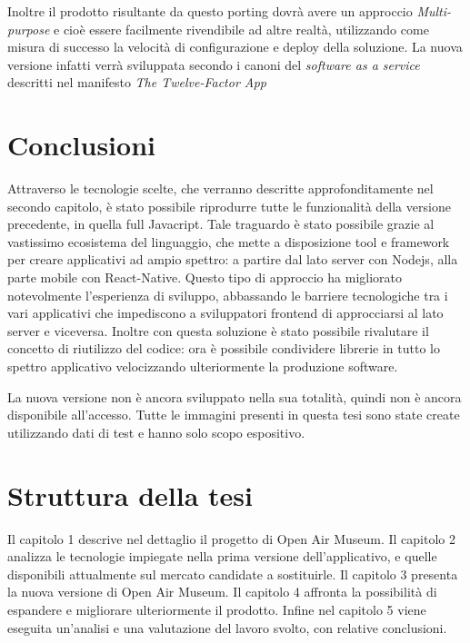 	Inoltre il prodotto risultante da questo porting dovrà avere un approccio \emph{Multi-purpose} e cioè essere facilmente rivendibile ad altre realtà, utilizzando come misura di successo la velocità di configurazione e deploy della soluzione. La nuova versione infatti verrà sviluppata secondo i canoni del \emph{software as a service} descritti nel manifesto \emph{The Twelve-Factor App}\cite{twfapp}

\section*{Conclusioni}\vspace{5mm}

Attraverso le tecnologie scelte, che verranno descritte approfonditamente nel secondo capitolo, è stato possibile riprodurre tutte le funzionalità della versione precedente, in quella full Javacript. Tale traguardo è stato possibile grazie al vastissimo ecosistema del linguaggio, che mette a disposizione tool e framework per creare applicativi ad ampio spettro: a partire dal lato server con Nodejs, alla parte mobile con React-Native. Questo tipo di approccio ha migliorato notevolmente l'esperienza di sviluppo, abbassando le barriere tecnologiche tra i vari applicativi che impediscono a sviluppatori frontend di approcciarsi al lato server e viceversa. Inoltre con questa soluzione è stato possibile rivalutare il concetto di riutilizzo del codice: ora è possibile condividere librerie in tutto lo spettro applicativo velocizzando ulteriormente la produzione software.\vspace{5mm}

La nuova versione non è ancora sviluppato nella sua totalità, quindi non è ancora disponibile all'accesso. Tutte le immagini presenti in questa tesi sono state create utilizzando dati di test e hanno solo scopo espositivo.
	
\section*{Struttura della tesi}\vspace{5mm}
	
Il capitolo 1 descrive nel dettaglio il progetto di Open Air Museum. Il capitolo 2 analizza le tecnologie impiegate nella prima versione dell'applicativo, e quelle disponibili attualmente sul mercato candidate a sostituirle. Il capitolo 3 presenta la nuova versione di Open Air Museum. Il capitolo 4 affronta la possibilità di espandere e migliorare ulteriormente il prodotto. Infine nel capitolo 5 viene eseguita un’analisi e una valutazione del lavoro svolto, con relative conclusioni. 


